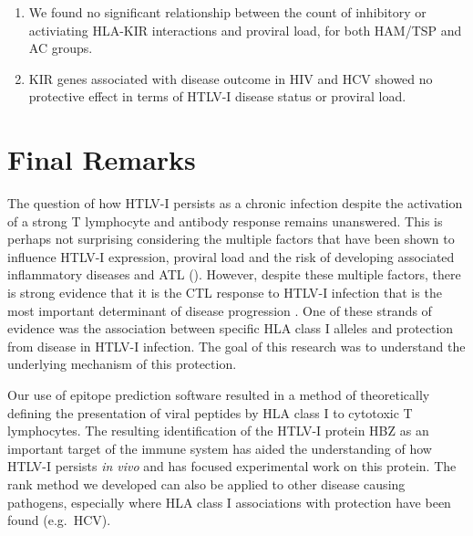 \begin{enumerate}[(1)]
\item We found no significant relationship between the count of inhibitory or activiating HLA-KIR interactions and proviral load, for both HAM/TSP and AC groups. 
\item KIR genes associated with disease outcome in HIV and HCV showed no protective effect in terms of HTLV-I disease status or proviral load.
\end{enumerate}

\section{Final Remarks}


The question of how HTLV-I persists as a chronic infection despite the activation of a strong T lymphocyte and antibody response remains unanswered. This is perhaps not surprising considering the multiple factors that have been shown to influence HTLV-I expression, proviral load and the risk of developing associated inflammatory diseases and ATL (). However, despite these multiple factors, there is strong evidence that it is the CTL response to HTLV-I infection that is the most important determinant of disease progression \citep{Niewiesk1995, Kubota2007, Vine2004, Jeffery1999, Jeffery2000, Asquith2005a}. One of these strands of evidence was the association between specific HLA class I alleles and protection from disease in HTLV-I infection. The goal of this research was to understand the underlying mechanism of this protection.

Our use of epitope prediction software resulted in a method of theoretically defining the presentation of viral peptides by HLA class I to cytotoxic T lymphocytes. The resulting identification of the HTLV-I protein HBZ as an important target of the immune system has aided the understanding of how HTLV-I persists \emph{in vivo} and has focused experimental work on this protein. The rank method we developed can also be applied to other disease causing pathogens, especially where HLA class I associations with protection have been found (e.g.~HCV).   



